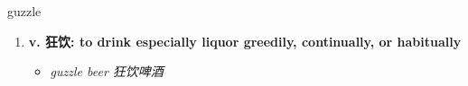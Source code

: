 
\begin{frame}
{\huge guzzle}
\begin{center}
\begin{enumerate}\Large
  \item \textbf{v. 狂饮: to drink especially liquor greedily, continually, or habitually}
  \begin{itemize}
    \item \em{\Large{guzzle beer 狂饮啤酒}}
  \end{itemize}
\end{enumerate}
\end{center}
\end{frame}

